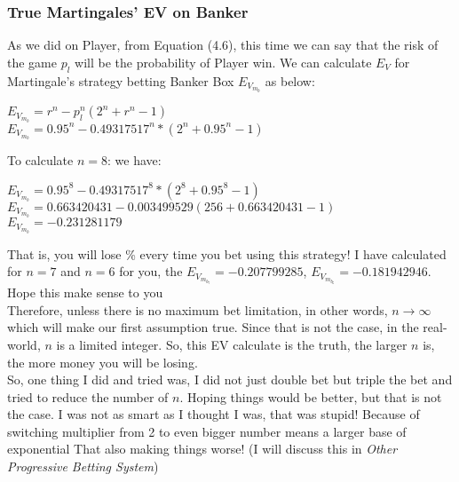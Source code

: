 \documentclass{article}
\begin{document}
\subsubsection{True Martingales' EV on Banker}
As we did on Player, from Equation (4.6), this time we can say that the risk of the game $p_l$ will be the probability of Player win. We can calculate $E_V$ for Martingale's strategy betting Banker Box $E_{V_{m_b}}$ as below: \\
\begin{center}
$E_{V_{m_b}}=r^n-p_l^n(2^n+r^n-1)$\\
$E_{V_{m_b}}=0.95^n-0.49317517^n*(2^n+0.95^n-1)$\\
\end{center} 
\begin{center}
\end{center}
To calculate $n=8$: we have:\par
\begin{center}
$E_{V_{m_b}}=0.95^8-0.49317517^8*(2^8+0.95^8-1)$\\
$E_{V_{m_b}}=0.663420431-0.003499529(256+0.663420431-1)$\\
$E_{V_{m_b}}=-0.231281179$\\
\end{center}

That is, you will lose \% every time you bet using this strategy! I have calculated for $n=7$ and $n=6$ for you, the $E_{V_{m_{b_7}}}=-0.207799285$, $E_{V_{m_{b_6}}}=-0.181942946$.  Hope this make sense to you \\

Therefore, unless there is no maximum bet limitation, in other words, $n\rightarrow\infty$ which will make our first assumption true.  Since that is not the case, in the real-world, $n$ is a limited integer.  So, this EV calculate is the truth, the larger $n$ is, the more money you will be losing.  \\

So, one thing I did and tried was, I did not just double bet but triple the bet and tried to reduce the number of $n$.  Hoping things would be better, but that is not the case.  I was not as smart as I thought I was, that was stupid!  Because of switching multiplier from 2 to even bigger number means a larger base of exponential That also making things worse!  (I will discuss this in \emph{Other Progressive Betting System})\\
\end{document}
